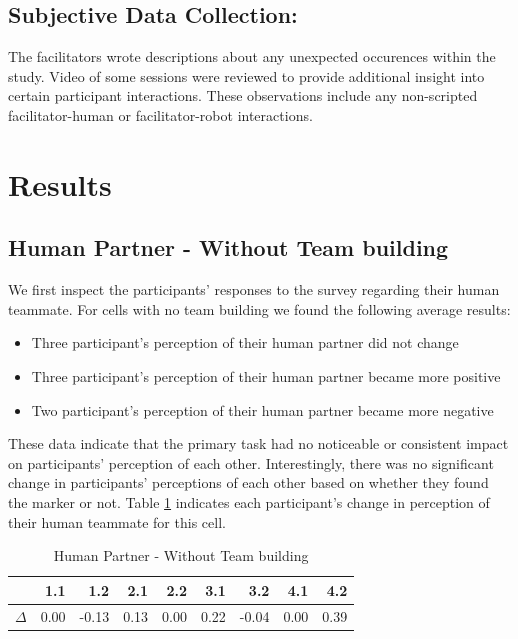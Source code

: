 \documentclass{acm_proc_article-sp}
\begin{document}
\subsection{Subjective Data Collection:}
The facilitators wrote descriptions about any unexpected occurences within the study. Video of some sessions were reviewed to provide additional insight into certain participant interactions. These observations include any non-scripted facilitator-human or facilitator-robot interactions. 


\section{Results}
\label{section:results}

\subsection{Human Partner - Without Team building}
We first inspect the participants' responses to the survey regarding their human teammate. For cells with no team building we found the following average results:
\begin{itemize}
 \item Three participant's perception of their human partner did not change
 \item Three participant's perception of their human partner became more positive
 \item Two participant's perception of their human partner became more negative
\end{itemize}
These data indicate that the primary task had no noticeable or consistent impact on participants' perception of each other. Interestingly, there was no significant change in participants' perceptions of each other based on whether they found the marker or not.  Table \ref{table:HNT} indicates each participant's change in perception of their human teammate for this cell.

\begin{table}
\centering
\caption{Human Partner - Without Team building}
\begin{tabular}{|r|r|r|r|r|r|r|r|r|} \hline
&1.1&1.2&2.1&2.2&3.1&3.2&4.1&4.2\\ \hline
$\Delta$&0.00&-0.13&0.13&0.00&0.22&-0.04&0.00&0.39 \\ \hline
\end{tabular}
\label{table:HNT}
\end{table}
\end{document}
